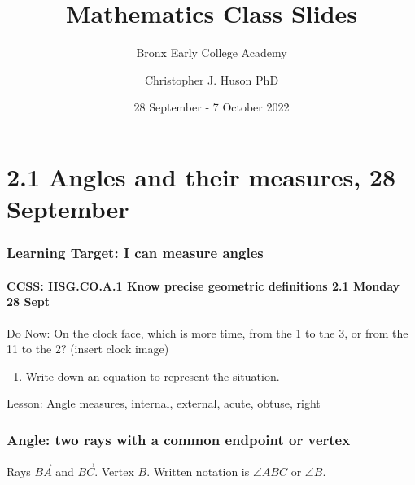 \documentclass{beamer}
\title{Mathematics Class Slides}
\subtitle{Bronx Early College Academy}
\author{Christopher J. Huson PhD}
\date{28 September - 7 October 2022}
\begin{document}
\frame{\titlepage}
\section[Outline]{}
\frame{\tableofcontents}

\section{2.1 Angles and their measures, 28 September}
\frame
{
  \frametitle{Learning Target: I can measure angles}
  \framesubtitle{CCSS: HSG.CO.A.1 Know precise geometric definitions  \hfill \alert{2.1 Monday 28 Sept}}

  \begin{block}{Do Now: On the clock face, which is more time, from the 1 to the 3, or from the 11 to the 2? (insert clock image)}
  \begin{enumerate}
    \item Write down an equation to represent the situation.
  \end{enumerate}
  \end{block}
  Lesson: Angle measures, internal, external, acute, obtuse, right
}

\frame
{
  \frametitle{Angle: two rays with a common endpoint or vertex}
  Rays $\overrightarrow{BA}$ and $\overrightarrow{BC}$. Vertex $B$.
  Written notation is $\angle ABC$ or $\angle B$. \\[0.75cm]
        \begin{center}
          \end{center}
}
\end{document}
